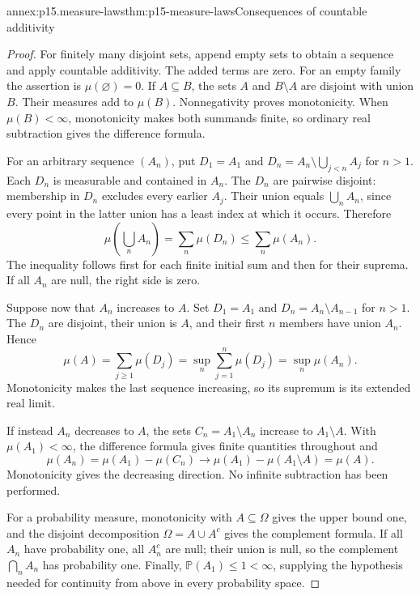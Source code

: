 \begin{annexitem}{annex:p15.measure-laws}{thm:p15-measure-laws}{Consequences of countable additivity}
\begin{proof}
For finitely many disjoint sets, append empty sets to obtain a sequence
and apply countable additivity. The added terms are zero. For an empty
family the assertion is \(\mu(\varnothing)=0\). If \(A\subseteq B\),
the sets \(A\) and \(B\setminus A\) are disjoint with union \(B\).
Their measures add to \(\mu(B)\). Nonnegativity proves monotonicity.
When \(\mu(B)<\infty\), monotonicity makes both summands finite,
so ordinary real subtraction gives the difference formula.

For an arbitrary sequence \((A_n)\), put \(D_1=A_1\) and
\(D_n=A_n\setminus\bigcup_{j<n}A_j\) for \(n>1\).
Each \(D_n\) is measurable and contained in \(A_n\). The \(D_n\)
are pairwise disjoint: membership in \(D_n\) excludes every earlier
\(A_j\). Their union equals \(\bigcup_n A_n\), since every point
in the latter union has a least index at which it occurs. Therefore
\[
 \mu\left(\bigcup_n A_n\right)=\sum_n\mu(D_n)
       \leq\sum_n\mu(A_n).
\]
The inequality follows first for each finite initial sum and then for
their suprema. If all \(A_n\) are null, the right side is zero.

Suppose now that \(A_n\) increases to \(A\). Set
\(D_1=A_1\) and \(D_n=A_n\setminus A_{n-1}\) for \(n>1\).
The \(D_n\) are disjoint, their union is \(A\), and their first
\(n\) members have union \(A_n\). Hence
\[
 \mu(A)=\sum_{j\geq1}\mu(D_j)
       =\sup_n\sum_{j=1}^n\mu(D_j)=\sup_n\mu(A_n).
\]
Monotonicity makes the last sequence increasing, so its supremum is its
extended real limit.

If instead \(A_n\) decreases to \(A\), the sets
\(C_n=A_1\setminus A_n\) increase to \(A_1\setminus A\).
With \(\mu(A_1)<\infty\), the difference formula gives finite
quantities throughout and
\[
 \mu(A_n)=\mu(A_1)-\mu(C_n)
     \longrightarrow\mu(A_1)-\mu(A_1\setminus A)=\mu(A).
\]
Monotonicity gives the decreasing direction. No infinite subtraction
has been performed.

For a probability measure, monotonicity with \(A\subseteq\Omega\)
gives the upper bound one, and the disjoint decomposition
\(\Omega=A\cup A^c\) gives the complement formula. If all \(A_n\)
have probability one, all \(A_n^c\) are null; their union is null, so
the complement \(\bigcap_n A_n\) has probability one. Finally,
\(\mathbb P(A_1)\leq1<\infty\), supplying the hypothesis needed
for continuity from above in every probability space.
\end{proof}
\end{annexitem}

